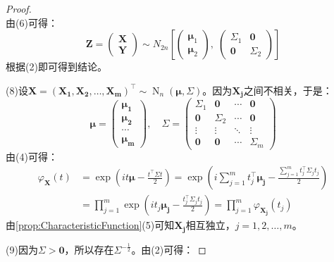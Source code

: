 \begin{proof}
\begin{equation*}
	\end{equation*}
	由(6)可得：
	\begin{equation*}
		\mathbf{Z}=
		\begin{pmatrix}
			\mathbf{X} \\
			\mathbf{Y}
		\end{pmatrix}
		\sim N_{2n}\left[
		\begin{pmatrix}
			\boldsymbol{\mu}_1 \\
			\boldsymbol{\mu}_2
		\end{pmatrix},\;
		\begin{pmatrix}
			\Sigma_1 & \mathbf{0} \\
			\mathbf{0} & \Sigma_2
		\end{pmatrix}
		\right]
	\end{equation*}
	根据(2)即可得到结论。\par
	(8)设$\mathbf{X}=(\mathbf{X_1},\mathbf{X_2},\dots,\mathbf{X_m})^{\top}\sim\operatorname{N}_n(\boldsymbol{\mu},\Sigma)$。因为$\mathbf{X_j}$之间不相关，于是：
	\begin{equation*}
		\boldsymbol{\mu}=
		\begin{pmatrix}
			\boldsymbol{\mu_1} \\
			\boldsymbol{\mu_2} \\
			\cdots \\
			\boldsymbol{\mu_m}
		\end{pmatrix},\quad
		\Sigma=
		\begin{pmatrix}
			\Sigma_1 & \mathbf{0} & \cdots & \mathbf{0} \\
			\mathbf{0} & \Sigma_2 & \cdots & \mathbf{0} \\
			\vdots & \vdots & \ddots & \vdots \\
			\mathbf{0} & \mathbf{0} & \cdots & \Sigma_m
		\end{pmatrix}
	\end{equation*}
	由(4)可得：
	\begin{align*}
		\varphi_\mathbf{X}(t)
		&=\exp\left(it\boldsymbol{\mu}-\frac{t^{\top}\Sigma t}{2}\right)
		=\exp\left(i\sum_{j=1}^{m}t_j^{\top}\boldsymbol{\mu_j}-\frac{\sum\limits_{j=1}^{m}t_j^{\top}\Sigma_j t_j}{2}\right) \\
		&=\prod_{j=1}^m\exp\left(it_j\boldsymbol{\mu_j}-\frac{t_j^{\top}\Sigma_j t_j}{2}\right)=\prod_{j=1}^m\varphi_\mathbf{X_j}(t_j)
	\end{align*}
	由\cref{prop:CharacteristicFunction}(5)可知$\mathbf{X_j}$相互独立，$j=1,2,\dots,m$。\par
	(9)因为$\Sigma>\mathbf{0}$，所以存在$\Sigma^{-\frac{1}{2}}$。由(2)可得：

\end{proof}
